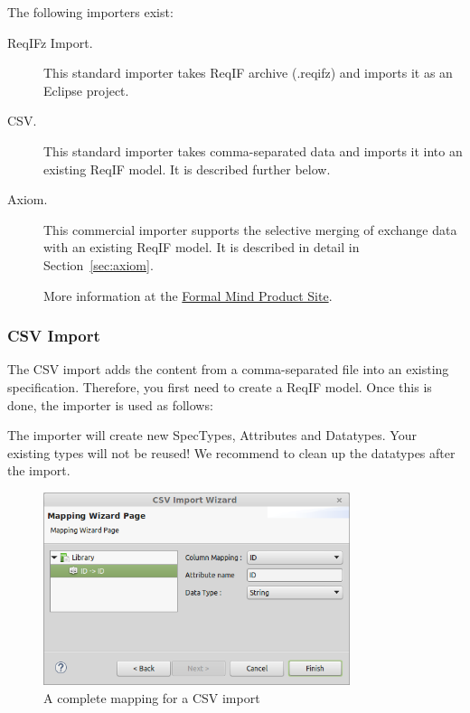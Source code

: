 The following importers exist:

\begin{description}
\item[ReqIFz Import.] This standard importer takes ReqIF archive (.reqifz) and imports it as an Eclipse project.

\item[CSV.] This standard importer takes comma-separated data and imports it into an existing ReqIF model.  It is described further below.

\item[Axiom.] This commercial importer supports the selective merging of exchange data with an existing ReqIF model.  It is described in detail in Section~\ref{sec:axiom}.

More information at the \href{http://formalmind.com/axiom}{Formal Mind Product Site}.

\end{description}

\subsubsection{CSV Import}

The CSV import adds the content from a comma-separated file into an existing specification.  Therefore, you first need to create a ReqIF model.  Once this is done, the importer is used as follows:

\begin{warning}
The importer will create new SpecTypes, Attributes and Datatypes.  Your existing types will not be reused!  We recommend to clean up the datatypes after the import.
\end{warning}

\begin{figure}
  \centering
  \includegraphics[width=0.8\textwidth]{../rmf-images/CSV_import.png}
  \caption{A complete mapping for a CSV import}
  \label{fig:csv}
\end{figure}

